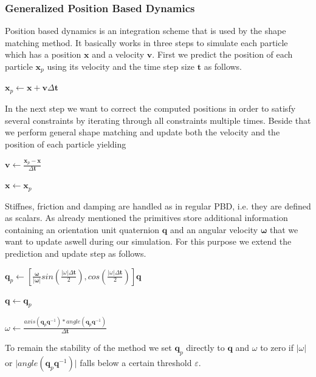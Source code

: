 \documentclass[
	11pt, 
	DIV10,
	a4paper, 
	oneside, 
	headings=normal, 
	captions=tableheading,
	final, 
	numbers=noenddot
]{scrartcl}
\begin{document}
\subsubsection{Generalized Position Based Dynamics}
	Position based dynamics is an integration scheme that is used by the shape matching method. It basically works in three steps to simulate each particle which has a position $\mathbf{x}$ and a velocity $\mathbf{v}$. First we predict the position of each particle $\mathbf{x}_p$ using its velocity and the time step size $\mathbf{t}$ as follows.
	\begin{center}
		$\mathbf{x}_p \leftarrow \mathbf{x}+\mathbf{v}\Delta \mathbf{t}$
	\end{center}
	\noindent In the next step we want to correct the computed positions in order to satisfy several constraints by iterating through all constraints multiple times.\cite{2} Beside that we perform general shape matching and update both the velocity and the position of each particle yielding
	\begin{center}
		$\mathbf{v} \leftarrow \frac{\mathbf{x}_p - \mathbf{x}}{\Delta \mathbf{t}}$
	\end{center}
	\begin{center}
		$\mathbf{x} \leftarrow \mathbf{x}_p$
	\end{center}
	\noindent Stiffnes, friction and damping are handled as in regular PBD, i.e. they are defined as scalars.
	As already mentioned the primitives store additional information containing an orientation unit quaternion $\mathbf{q}$ and an angular velocity $\mathbf{\omega}$ that we want to update aswell during our simulation.
	For this purpose we extend the prediction and update step as follows.
	\begin{center}
		$\mathbf{q}_p \leftarrow [\frac{\mathbf{\omega}}{\vert \mathbf{\omega \vert}} sin(\frac{\vert \omega \vert \Delta \mathbf{t}}{2}), cos(\frac{\vert \omega \vert \Delta \mathbf{t}}{2})]\mathbf{q}$
	\end{center}
	\begin{center}
		$\mathbf{q} \leftarrow \mathbf{q}_p$
	\end{center}
	\begin{center}
		$\omega \leftarrow \frac{axis(\mathbf{q}_p \mathbf{q}^{-1})*angle(\mathbf{q}_p \mathbf{q}^{-1})}{\Delta \mathbf{t}}$
	\end{center}
	\noindent To remain the stability of the method we set $\mathbf{q}_p$ directly to $\mathbf{q}$ and $\omega$ to zero if $\vert \omega \vert$ or $\vert angle(\mathbf{q}_p \mathbf{q}^{-1})\vert$ falls below a certain threshold $\varepsilon$.\cite{2}
	
\end{document}
